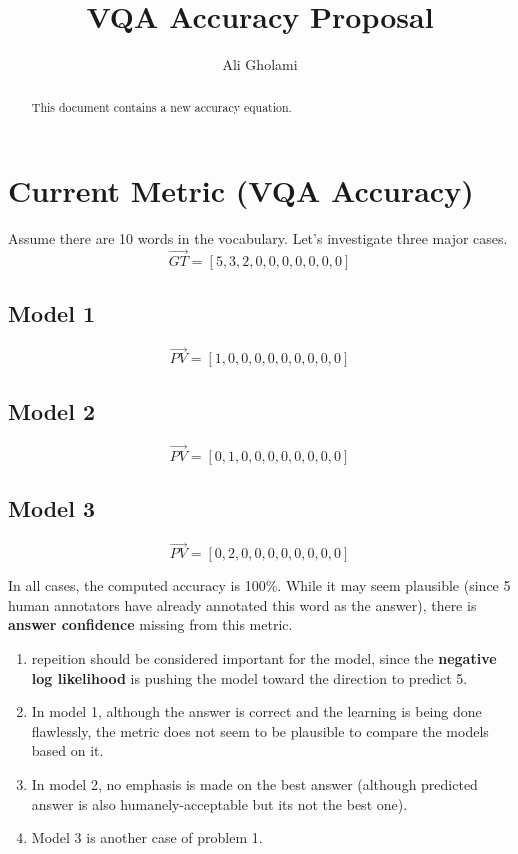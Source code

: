 \documentclass{article}
\begin{document}
\title{VQA Accuracy Proposal}
\author{Ali Gholami}

\maketitle

\begin{abstract}
This document contains a new accuracy equation.
\end{abstract}

\section{Current Metric (VQA Accuracy)}
Assume there are 10 words in the vocabulary. Let's investigate three major cases.
$$
    \vec{GT} = [5, 3, 2, 0, 0, 0, 0, 0, 0, 0]
$$
\subsection{Model 1}
$$
    \vec{PV} = [1, 0, 0, 0, 0, 0, 0, 0, 0, 0]
$$
\subsection{Model 2}
$$
    \vec{PV} = [0, 1, 0, 0, 0, 0, 0, 0, 0, 0]
$$
\subsection{Model 3}
$$
    \vec{PV} = [0, 2, 0, 0, 0, 0, 0, 0, 0, 0]
$$

In all cases, the computed accuracy is 100\%.
While it may seem plausible (since 5 human annotators have already annotated this word as the answer), there is \textbf{answer confidence} missing from this metric.
\begin{enumerate}
    \item repeition should be considered important for the model, since the \textbf{negative log likelihood} is pushing the model toward the direction to predict 5.
    \item In model 1, although the answer is correct and the learning is being done flawlessly, the metric does not seem to be plausible to compare the models based on it.
    \item In model 2, no emphasis is made on the best answer (although predicted answer is also humanely-acceptable but its not the best one).
    \item Model 3 is another case of problem 1.
\end{enumerate}
\end{document}
